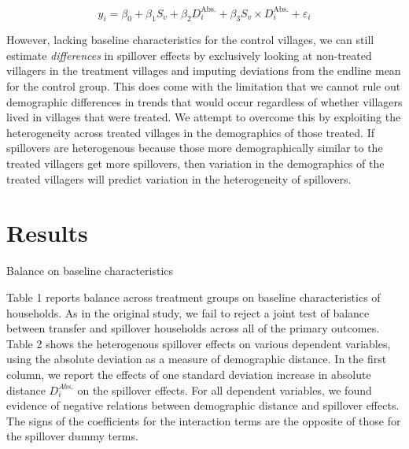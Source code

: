 \documentclass[11pt]{article}
\begin{document}
    \begin{equation*}
    y_i = \beta_0 + \beta_1 S_v + \beta_2 D^\text{Abs.}_i + \beta_3 S_v \times D^\text{Abs.}_i + \varepsilon_i
    \end{equation*}

    However, lacking baseline characteristics for the control villages, we can still estimate \textit{differences} in spillover effects by exclusively looking at non-treated villagers in the treatment villages and imputing deviations from the endline mean for the control group. This does come with the limitation that we cannot rule out demographic differences in trends that would occur regardless of whether villagers lived in villages that were treated. We attempt to overcome this by exploiting the heterogeneity across treated villages in the demographics of those treated. If spillovers are heterogenous because those more demographically similar to the treated villagers get more spillovers, then variation in the demographics of the treated villagers will predict variation in the heterogeneity of spillovers.


\section{Results}

    \begin{table}[H]
    \centering
    \caption{Balance on baseline characteristics}
    \end{table}

    Table 1 reports balance across treatment groups on baseline characteristics of households. As in the original study, we fail to reject a joint test of balance between transfer and spillover households across all of the primary outcomes. Table 2 shows the heterogenous spillover effects on various dependent variables, using the absolute deviation as a measure of demographic distance. In the first column, we report the effects of one standard deviation increase in absolute distance  $D_i^{Abs.}$ on the spillover effects. For all dependent variables, we found evidence of negative relations between demographic distance and spillover effects. The signs of the coefficients for the interaction terms are the opposite of those for the spillover dummy terms. \\
\end{document}
